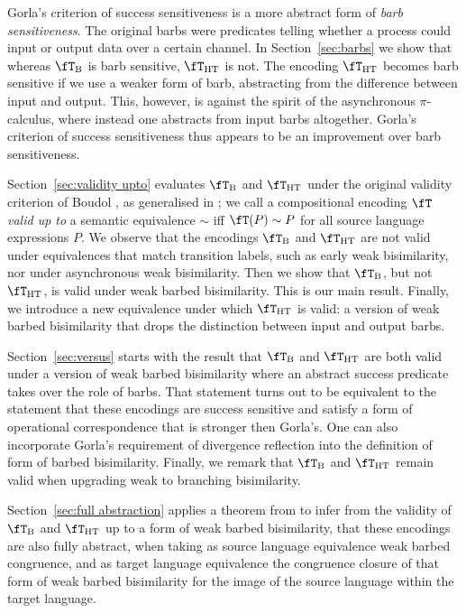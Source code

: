 \documentclass[runningheads]{llncs}
\newcommand{\sect}[1]{Section~\ref{sec:#1}}
\newcommand{\fTHT}{\fT_{\textrm{HT}}}       %
\newcommand{\trans}[1]{\fT(#1)}
\begin{document}
Gorla's criterion of success sensitiveness is a more abstract form of \emph{barb sensitiveness}.
The original barbs were predicates telling whether a process could input or output data over a
certain channel. In \sect{barbs} we show that whereas $\fT_{\rm B}$ is barb sensitive, $\fT_{\rm HT}$
is not. The encoding $\fT_{\rm HT}$ becomes barb sensitive if we use a weaker form of barb,
abstracting from the difference between input and output. This, however, is against the spirit of the
asynchronous $\pi$-calculus, where instead one abstracts from input barbs altogether.
Gorla's  criterion of success sensitiveness thus appears to be an improvement over barb sensitiveness.

\sect{validity upto} evaluates $\fT_{\rm B}$ and $\fT_{\rm HT}$ under the original validity criterion
of Boudol \cite{Bo85}, as generalised in \cite{vG12}; we call a compositional encoding $\fT$ \emph{valid up to}
a semantic equivalence ${\sim}$ iff $\trans{P} \sim P$ for all source language expressions $P$.
We observe that the encodings $\fT_{\rm B}$ and $\fT_{\rm HT}$ are not valid under equivalences that
match transition labels, such as early weak bisimilarity, nor under asynchronous weak bisimilarity.
Then we show that $\fT_{\rm B}$, but not $\fTHT$, is valid under weak barbed bisimilarity. This is
our main result. Finally, we introduce a new equivalence under which $\fTHT$ is valid: a version of
weak barbed bisimilarity that drops the distinction between input and output barbs.

\sect{versus} starts with the result that $\fT_{\rm B}$ and $\fT_{\rm HT}$ are both valid under a
version of weak barbed bisimilarity where an abstract success predicate takes over the role of barbs.
That statement turns out to be equivalent to the statement that these encodings are success sensitive
and satisfy a form of operational correspondence that is stronger then Gorla's. One can also
incorporate Gorla's requirement of divergence reflection into the definition of form of barbed bisimilarity.
Finally, we remark that $\fT_{\rm B}$ and $\fT_{\rm HT}$ remain valid when upgrading weak to branching bisimilarity.

\sect{full abstraction} applies a theorem from \cite{vG18e} to infer from the validity of
$\fT_{\rm B}$ and $\fT_{\rm HT}$ up to a form of weak barbed bisimilarity, that these encodings are
also fully abstract, when taking as source language equivalence weak barbed congruence, and as
target language equivalence the congruence closure of that form of weak barbed bisimilarity for the
image of the source language within the target language.
\end{document}
